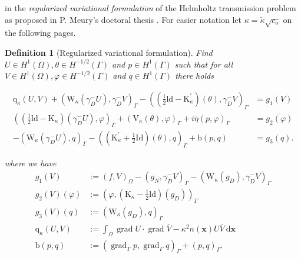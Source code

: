 \documentclass[10pt,journal,compsoc, onecolumn]{IEEEtran}
\newtheorem{definition}[theorem]{Definition}
\begin{document}
in the  \textit{regularized variational formulation} of the Helmholtz transmission problem 
as proposed in P. Meury's doctoral thesis \cite{meury2007stable}. 
For easier notation let $\kappa = \tilde \kappa \sqrt{c_o}$ on the following pages.
\newpage
\begin{definition}[Regularized variational formulation]
    Find \(U \in H^{1}(\Omega), \theta \in H^{-1 / 2}(\Gamma)\) and \(p \in H^{1}(\Gamma)\) such that for all \(V \in H^{1}(\Omega), \varphi \in H^{-1 / 2}(\Gamma)\)
    and \(q \in H^{1}(\Gamma)\) there holds

    \begin{align}
        \mathrm{q}_{\kappa}(U, V)+\left(\mathrm{W}_{\kappa}\left(\gamma_{D}^{-} U\right), \gamma_{D}^{-} V\right)_{\Gamma}-\left((\frac{1}{2} \mathrm{ld}-\mathrm{K}_{\kappa}^{\prime})(\theta), \gamma_{D}^{-} V\right)_{\Gamma} &=g_1(V) \nonumber\\
        \left((\frac{1}{2} \mathrm{ld}-\mathrm{K}_{\kappa})\left(\gamma_{D}^{-} U\right), \varphi\right)_{\Gamma}+\left(\mathrm{V}_{\kappa}(\theta), \varphi\right)_{\Gamma}+i \overline{\eta}(p, \varphi)_{\Gamma} &=\overline{g_2(\varphi)} \label{eq:variational_formulation}\\
        -\left(\mathrm{W}_{\kappa}\left(\gamma_{D}^{-} U\right), q\right)_{\Gamma}-\left((\mathrm{K}_{\kappa}^{\prime}+\frac{1}{2} \mathrm{Id})(\theta), q\right)_{\Gamma}+\mathrm{b}(p, q) &=g_3(q). \nonumber
    \end{align}

    where we have 
    $$
    \begin{aligned} 
        g_1(V) &:=(f, V)_{\Omega}-\left(g_{N}, \gamma_{D}^{-} V\right)_{\Gamma}-\left(\mathrm{W}_{\kappa}\left(g_{D}\right), \gamma_{D}^{-} V\right)_{\Gamma} \\ 
        g_2(V)(\varphi) &:=\left(\varphi,\left(\mathrm{K}_{\kappa}-\frac{1}{2} \mathrm{ld}\right)\left(g_{D}\right)\right)_{\Gamma} \\ 
        g_3(V)(q) &:=\left(\mathrm{W}_{\kappa}\left(g_{D}\right), q\right)_{\Gamma} \\ 
        \mathrm{q}_{\kappa}(U, V)& :=\int_{\Omega} \operatorname{grad} U \cdot \operatorname{grad} \bar{V}-\kappa^{2} n(\mathbf{x}) U \bar{V} \mathrm{~d} \mathbf{x} \\
        \mathrm{b}(p, q)& :=\left(\operatorname{grad}_{\Gamma} p, \operatorname{grad}_{\Gamma} q\right)_{\Gamma}+(p, q)_{\Gamma}.
    \end{aligned}
    $$

\end{definition}
\end{document}
